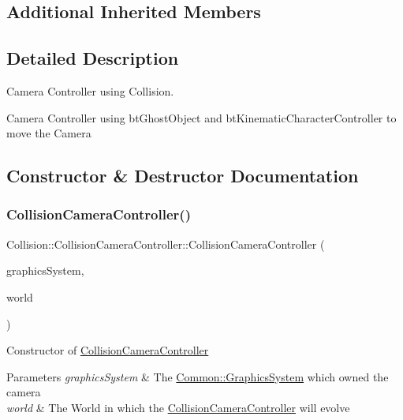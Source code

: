\subsection*{Additional Inherited Members}


\subsection{Detailed Description}
Camera Controller using Collision. 

Camera Controller using bt\+Ghost\+Object and bt\+Kinematic\+Character\+Controller to move the Camera 

\subsection{Constructor \& Destructor Documentation}
\mbox{\label{class_collision_1_1_collision_camera_controller_ac22915566c34afa0c50400e26dcb667b}} 
\subsubsection{\texorpdfstring{Collision\+Camera\+Controller()}{CollisionCameraController()}}
{\footnotesize\ttfamily Collision\+::\+Collision\+Camera\+Controller\+::\+Collision\+Camera\+Controller (\begin{DoxyParamCaption}\item[{\hyperlink{class_common_1_1_graphics_system}{Common\+::\+Graphics\+System} $\ast$}]{graphics\+System,  }\item[{bt\+Dynamics\+World $\ast$}]{world }\end{DoxyParamCaption})}

Constructor of \hyperlink{class_collision_1_1_collision_camera_controller}{Collision\+Camera\+Controller} 
\begin{DoxyParams}{Parameters}
{\em graphics\+System} & The \hyperlink{class_common_1_1_graphics_system}{Common\+::\+Graphics\+System} which owned the camera \\
\hline
{\em world} & The World in which the \hyperlink{class_collision_1_1_collision_camera_controller}{Collision\+Camera\+Controller} will evolve \\
\hline
\end{DoxyParams}


